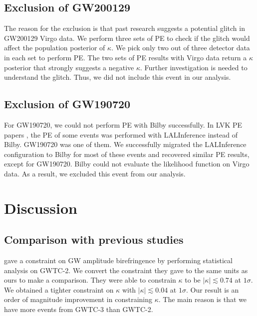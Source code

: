 \documentclass[aps,prd,twocolumn,superscriptaddress,preprintnumbers,floatfix,nofootinbib]{revtex4-2}
\begin{document}
\subsection{Exclusion of GW200129}
\label{sec:GW200129}
The reason for the exclusion is that past research suggests a potential glitch in GW200129 Virgo data. \citep{GW200129_glitch}
We perform three sets of PE to check if the glitch would affect the population posterior of $\kappa$.
We pick only two out of three detector data in each set to perform PE.
The two sets of PE results with Virgo data return a $\kappa$ posterior that strongly suggests a negative $\kappa$.
Further investigation is needed to understand the glitch.
Thus, we did not include this event in our analysis.

\subsection{Exclusion of GW190720}
\label{sec:GW190720}
For GW190720, we could not perform PE with Bilby successfully.
In LVK PE papers \citep{GWTC-2.1, GWTC-3}, the PE of some events was performed with LALInference \citep{lalsuite} instead of Bilby.
GW190720 was one of them.
We successfully migrated the LALInference configuration to Bilby for most of these events and recovered similar PE results, except for GW190720.
Bilby could not evaluate the likelihood function on Virgo data.
As a result, we excluded this event from our analysis.

\section{Discussion}
\label{sec:Discussion}

\subsection{Comparison with previous studies}
\citet{Okounkova_2022} gave a constraint on GW amplitude birefringence by performing statistical analysis on GWTC-2.
We convert the constraint they gave to the same units as ours to make a comparison.
They were able to constrain $\kappa$ to be $|\kappa| \lesssim 0.74$ at $1 \sigma$.
We obtained a tighter constraint on $\kappa$ with $|\kappa| \lesssim 0.04$ at $1 \sigma$.
Our result is an order of magnitude improvement in constraining $\kappa$.
The main reason is that we have more events from GWTC-3 than GWTC-2.
\end{document}
